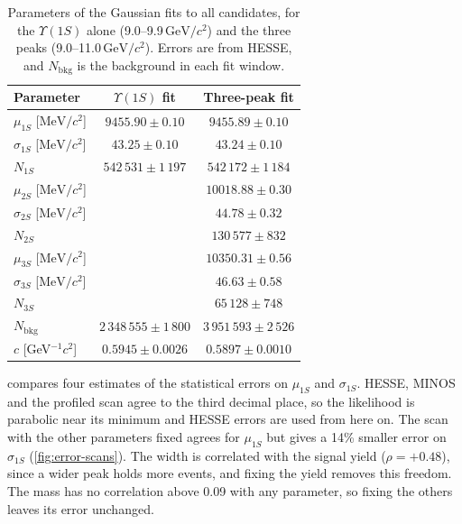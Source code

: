 \documentclass[a4paper,11pt]{article}
\newcommand{\MeVcc}{\ensuremath{\mathrm{MeV}/c^2}}
\newcommand{\GeVcc}{\ensuremath{\mathrm{GeV}/c^2}}
\newcommand{\Ups}[1]{\ensuremath{\Upsilon(#1)}}               %
\begin{document}
\begin{table}[H]
    \centering
    \caption{Parameters of the Gaussian fits to all candidates, for the \Ups{1S} alone (9.0--9.9\,\GeVcc) and
    the three peaks (9.0--11.0\,\GeVcc). Errors are from HESSE, and $N_\mathrm{bkg}$ is the background in
    each fit window.}
    \label{tab:gauss-params}
    \begin{tabular}{lcc}
        \toprule
        Parameter & \Ups{1S} fit & Three-peak fit \\
        \midrule
        $\mu_{1S}$ [\MeVcc] & $9455.90 \pm 0.10$ & $9455.89 \pm 0.10$ \\
        $\sigma_{1S}$ [\MeVcc] & $43.25 \pm 0.10$ & $43.24 \pm 0.10$ \\
        $N_{1S}$ & $542\,531 \pm 1\,197$ & $542\,172 \pm 1\,184$ \\
        $\mu_{2S}$ [\MeVcc] &  & $10018.88 \pm 0.30$ \\
        $\sigma_{2S}$ [\MeVcc] &  & $44.78 \pm 0.32$ \\
        $N_{2S}$ &  & $130\,577 \pm 832$ \\
        $\mu_{3S}$ [\MeVcc] &  & $10350.31 \pm 0.56$ \\
        $\sigma_{3S}$ [\MeVcc] &  & $46.63 \pm 0.58$ \\
        $N_{3S}$ &  & $65\,128 \pm 748$ \\
        \midrule
        $N_\mathrm{bkg}$ & $2\,348\,555 \pm 1\,800$ & $3\,951\,593 \pm 2\,526$ \\
        $c$ [GeV$^{-1}c^2$] & $0.5945 \pm 0.0026$ & $0.5897 \pm 0.0010$ \\
        \bottomrule
    \end{tabular}
\end{table}

 compares four estimates of the statistical errors on $\mu_{1S}$ and $\sigma_{1S}$.
HESSE, MINOS and the profiled scan agree to the third decimal place, so the likelihood is parabolic near its minimum and HESSE errors are used from here on.
The scan with the other parameters fixed agrees for $\mu_{1S}$ but gives a 14\% smaller error on $\sigma_{1S}$ (\cref{fig:error-scans}).
The width is correlated with the signal yield ($\rho = +0.48$), since a wider peak holds more events, and fixing the yield removes this freedom.
The mass has no correlation above 0.09 with any parameter, so fixing the others leaves its error unchanged.
\end{document}
